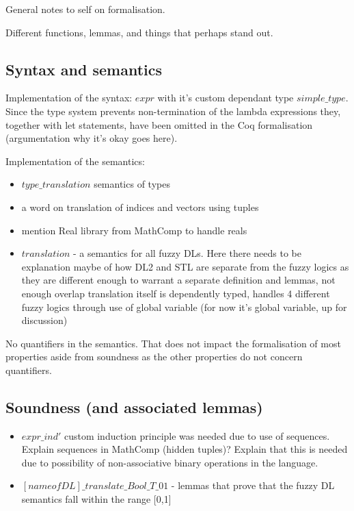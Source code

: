 \documentclass[a4paper,10pt]{article}
\begin{document}
General notes to self on formalisation.

Different functions, lemmas, and things that perhaps stand out.

\subsection{Syntax and semantics}

Implementation of the syntax: $expr$ with it's custom dependant type $simple\_type$. Since the type system prevents non-termination of the lambda expressions they, together with let statements, have been omitted in the Coq formalisation (argumentation why it's okay goes here).



Implementation of the semantics: 
\begin{itemize}
	\item $type\_translation$ semantics of types
	\item a word on translation of indices and vectors using tuples
	\item mention Real library from MathComp to handle reals
	\item $translation$ - a semantics for all fuzzy DLs. Here there needs to be explanation maybe of how DL2 and STL are separate from the fuzzy logics as they are different enough to warrant a separate definition and lemmas, not enough overlap
	translation itself is dependently typed, handles 4 different fuzzy logics through use of global variable (for now it's global variable, up for discussion)
	
\end{itemize}

No quantifiers in the semantics. That does not impact the formalisation of most properties aside from soundness as the other properties do not concern quantifiers.

\subsection{Soundness (and associated lemmas)}

\begin{itemize}
	\item $expr\_ind'$ custom induction principle was needed due to use of sequences. Explain sequences in MathComp (hidden tuples)? Explain that this is needed due to possibility of non-associative binary operations in the language.
	\item $[name of DL]\_translate\_Bool\_T\_01$ - lemmas that prove that the fuzzy DL semantics fall within the range [0,1]
\end{itemize}
\end{document}
